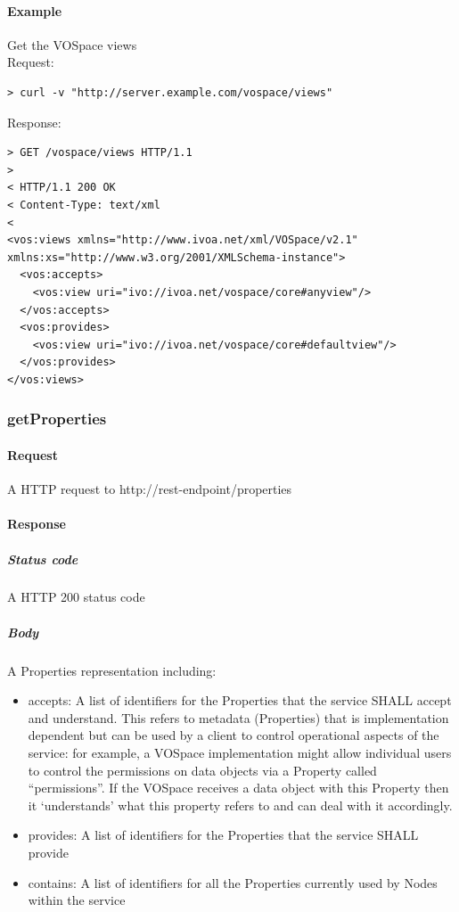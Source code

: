 \documentclass[11pt,a4paper]{ivoa}
\begin{document}
\paragraph{Example}
Get the VOSpace views
\\[5px]
\noindent
Request:
\begin{lstlisting}
> curl -v "http://server.example.com/vospace/views"
\end{lstlisting}
Response:
\begin{lstlisting}
> GET /vospace/views HTTP/1.1
>
< HTTP/1.1 200 OK
< Content-Type: text/xml
<
<vos:views xmlns="http://www.ivoa.net/xml/VOSpace/v2.1" xmlns:xs="http://www.w3.org/2001/XMLSchema-instance">
  <vos:accepts>
    <vos:view uri="ivo://ivoa.net/vospace/core#anyview"/>
  </vos:accepts>
  <vos:provides>
    <vos:view uri="ivo://ivoa.net/vospace/core#defaultview"/>
  </vos:provides>
</vos:views>
\end{lstlisting}

\subsubsection{getProperties}
\label{subsubsec:getproperties}

\paragraph{Request}
A HTTP request to http://rest-endpoint/properties

\paragraph{Response}
\subparagraph{Status code} A HTTP 200 status code
\subparagraph{Body}
A Properties representation including:
\begin{itemize}
    \item accepts: A list of identifiers for the Properties that the service SHALL accept and understand. This refers to metadata (Properties) that is implementation dependent but can be used by a client to control operational aspects of the service: for example, a VOSpace implementation might allow individual users to control the permissions on data objects via a Property called ``permissions''. If the VOSpace receives a data object with this Property then it `understands' what this property refers to and can deal with it accordingly.
    \item provides: A list of identifiers for the Properties that the service SHALL provide
    \item contains: A list of identifiers for all the Properties currently used by Nodes within the service
\end{itemize}
\end{document}
